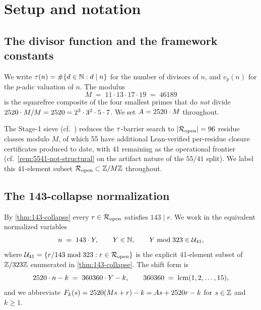 
\section{Setup and notation}
\label{sec:setup}

\subsection{The divisor function and the framework constants}

\begin{notation}
We write $\tau(n) = \#\{d \in \mathbb{N} : d \mid n\}$ for the number of
divisors of $n$, and $v_p(n)$ for the $p$-adic valuation of $n$. The
modulus
\[
M \;=\; 11 \cdot 13 \cdot 17 \cdot 19 \;=\; 46189
\]
is the squarefree composite of the four smallest primes that do
\emph{not} divide $2520 \cdot M / M = 2520 = 2^3 \cdot 3^2 \cdot 5 \cdot 7$.
We set $A = 2520 \cdot M$ throughout.

The Stage-1 sieve (cf.\ \cite{ErdosGraham1980,GuyB8}) reduces the
$\tau$-barrier search to $|\mathcal{R}_{\mathrm{open}}| = 96$ residue classes modulo $M$,
of which 55 have additional Lean-verified per-residue closure
certificates produced to date, with 41 remaining as the operational
frontier (cf.\ \cref{rem:5541-not-structural} on the artifact nature
of the $55/41$ split). We label this 41-element subset
$\mathcal{R}_{\mathrm{open}} \subset \mathbb{Z}/M\mathbb{Z}$ throughout.
\end{notation}

\subsection{The 143-collapse normalization}

\begin{notation}
By \cref{thm:143-collapse} every $r \in \mathcal{R}_{\mathrm{open}}$ satisfies
$143 \mid r$. We work in the equivalent normalized variables
\[
n \;=\; 143 \cdot Y , \qquad Y \in \mathbb{N} , \qquad Y \bmod 323 \in \mathcal{U}_{41} ,
\]
where $\mathcal{U}_{41} = \{r/143 \bmod 323 : r \in \mathcal{R}_{\mathrm{open}}\}$ is the explicit
41-element subset of $\mathbb{Z}/323\mathbb{Z}$ enumerated in \cref{thm:143-collapse}.
The shift form is
\[
2520 \cdot n - k \;=\; 360360 \cdot Y - k , \qquad
360360 \;=\; \operatorname{lcm}(1, 2, \ldots, 15) ,
\]
and we abbreviate $F_k(s) = 2520(Ms + r) - k = A s + 2520 r - k$ for
$s \in \mathbb{Z}$ and $k \ge 1$.
\end{notation}

